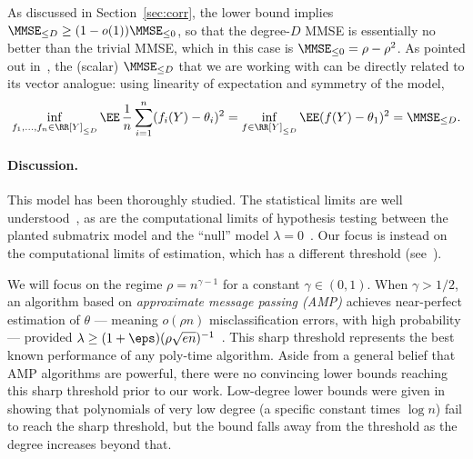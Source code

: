 \documentclass[11pt]{article}
\begin{document}
As discussed in Section~\ref{sec:corr}, the lower bound implies $\MMSE_{\le D} \ge (1-o(1)) \MMSE_{\le 0}$, so that the degree-$D$ MMSE is essentially no better than the trivial MMSE, which in this case is $\MMSE_{\le 0} = \rho - \rho^2$. As pointed out in~\cite{SW-estimation}, the (scalar) $\MMSE_{\le D}$ that we are working with can be directly related to its vector analogue: using linearity of expectation and symmetry of the model,
\[ \inf_{f_1,\ldots,f_n \in \RR[Y]_{\le D}} \EE \, \frac{1}{n} \sum_{i=1}^n (f_i(Y) - \theta_i)^2 = \inf_{f \in \RR[Y]_{\le D}} \EE  (f(Y) - \theta_1)^2 = \MMSE_{\le D}. \]


\paragraph{Discussion.}

This model has been thoroughly studied. The statistical limits are well understood~\cite{BI-info,kolar-info,BIS-info}, as are the computational limits of hypothesis testing between the planted submatrix model and the ``null'' model $\lambda = 0$~\cite{MW-reduction,BBH-reduction}. Our focus is instead on the computational limits of estimation, which has a different threshold (see~\cite{SW-estimation}).

We will focus on the regime $\rho = n^{\gamma-1}$ for a constant $\gamma \in (0,1)$. When $\gamma > 1/2$, an algorithm based on \emph{approximate message passing (AMP)} achieves near-perfect estimation of $\theta$ --- meaning $o(\rho n)$ misclassification errors, with high probability --- provided $\lambda \ge (1+\eps) (\rho\sqrt{en})^{-1}$~\cite{submatrix-amp}. This sharp threshold represents the best known performance of any poly-time algorithm. Aside from a general belief that AMP algorithms are powerful, there were no convincing lower bounds reaching this sharp threshold prior to our work. Low-degree lower bounds were given in~\cite[Appendix~E]{SW-estimation} showing that polynomials of very low degree (a specific constant times $\log n$) fail to reach the sharp threshold, but the bound falls away from the threshold as the degree increases beyond that.
\end{document}

